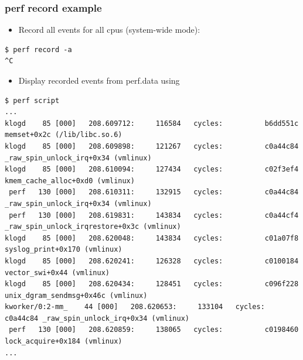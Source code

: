 \begin{frame}[fragile]
  \frametitle{perf record example}

  \begin{itemize}
    \item Record all events for all cpus (system-wide mode):
  \end{itemize}
  \begin{block}{}
    \begin{verbatim}
$ perf record -a
^C
    \end{verbatim}
  \end{block}
  \begin{itemize}
    \item Display recorded events from perf.data using 
  \end{itemize}
  \begin{block}{}
    \begin{verbatim}
$ perf script
...
klogd    85 [000]   208.609712:     116584   cycles:          b6dd551c memset+0x2c (/lib/libc.so.6)
klogd    85 [000]   208.609898:     121267   cycles:          c0a44c84 _raw_spin_unlock_irq+0x34 (vmlinux)
klogd    85 [000]   208.610094:     127434   cycles:          c02f3ef4 kmem_cache_alloc+0xd0 (vmlinux)
 perf   130 [000]   208.610311:     132915   cycles:          c0a44c84 _raw_spin_unlock_irq+0x34 (vmlinux)
 perf   130 [000]   208.619831:     143834   cycles:          c0a44cf4 _raw_spin_unlock_irqrestore+0x3c (vmlinux)
klogd    85 [000]   208.620048:     143834   cycles:          c01a07f8 syslog_print+0x170 (vmlinux)
klogd    85 [000]   208.620241:     126328   cycles:          c0100184 vector_swi+0x44 (vmlinux)
klogd    85 [000]   208.620434:     128451   cycles:          c096f228 unix_dgram_sendmsg+0x46c (vmlinux)
kworker/0:2-mm_    44 [000]   208.620653:     133104   cycles:          c0a44c84 _raw_spin_unlock_irq+0x34 (vmlinux)
 perf   130 [000]   208.620859:     138065   cycles:          c0198460 lock_acquire+0x184 (vmlinux)
...
    \end{verbatim}
  \end{block}
\end{frame}

